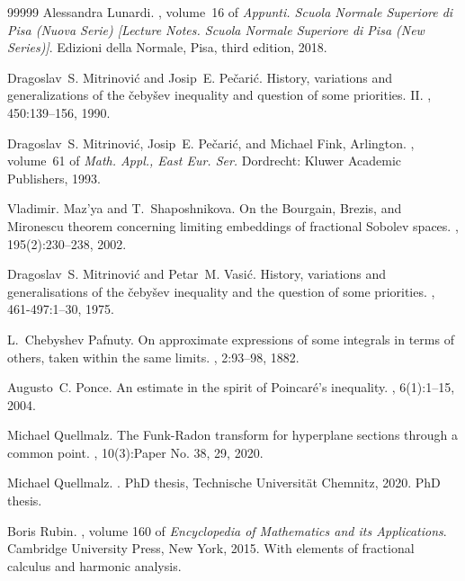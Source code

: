 \documentclass[12pt, reqno]{amsart}%
\theoremstyle{plain}  %
\theoremstyle{definition}  %
\theoremstyle{remark}
\numberwithin{equation}{section}
\begin{document}
{\begin{thebibliography}{99999}
Alessandra Lunardi.
, volume~16 of {\em Appunti. Scuola Normale
  Superiore di Pisa (Nuova Serie) [Lecture Notes. Scuola Normale Superiore di
  Pisa (New Series)]}.
\newblock Edizioni della Normale, Pisa, third edition, 2018.

Dragoslav~S. Mitrinovi{\'c} and Josip~E. Pe{\v{c}}ari{\'c}.
\newblock History, variations and generalizations of the {\v{c}}eby{\v{s}}ev
  inequality and question of some priorities. {II}.
, 450:139--156,
  1990.

Dragoslav~S. Mitrinovi{\'c}, Josip~E. Pe{\v{c}}ari{\'c}, and Michael Fink,
  Arlington.
, volume~61 of {\em
  Math. Appl., East Eur. Ser.}
\newblock Dordrecht: Kluwer Academic Publishers, 1993.

Vladimir. Maz'ya and T.~Shaposhnikova.
\newblock On the {B}ourgain, {B}rezis, and {M}ironescu theorem concerning
  limiting embeddings of fractional {S}obolev spaces.
, 195(2):230--238, 2002.

Dragoslav~S. Mitrinovi{\'c} and Petar~M. Vasi{\'c}.
\newblock History, variations and generalisations of the {\v{c}}eby{\v{s}}ev
  inequality and the question of some priorities.
, 461-497:1--30, 1975.

L.~Chebyshev Pafnuty.
\newblock On approximate expressions of some integrals in terms of others,
  taken within the same limits.
, 2:93--98, 1882.

Augusto~C. Ponce.
\newblock An estimate in the spirit of {P}oincar\'{e}'s inequality.
, 6(1):1--15, 2004.

Michael Quellmalz.
\newblock The {F}unk-{R}adon transform for hyperplane sections through a common
  point.
, 10(3):Paper No. 38, 29, 2020.

Michael Quellmalz.
.
\newblock PhD thesis, Technische Universit{\"a}t Chemnitz, 2020.
\newblock PhD thesis.

Boris Rubin.
, volume 160 of {\em
  Encyclopedia of Mathematics and its Applications}.
\newblock Cambridge University Press, New York, 2015.
\newblock With elements of fractional calculus and harmonic analysis.


\end{thebibliography}}
\end{document}
